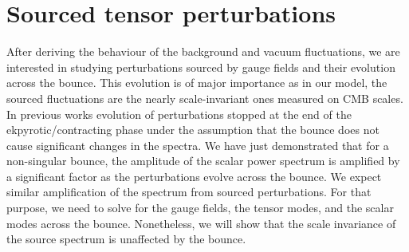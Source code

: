 \documentclass[12pt,a4paper]{article}
\numberwithin{equation}{section}
\numberwithin{equation}{section}
\begin{document}
\section{Sourced tensor perturbations} 
\label{sec:sourced}
After deriving the behaviour of the background and vacuum fluctuations, we are interested in studying perturbations sourced by gauge fields and their evolution across the bounce. This evolution is of major importance as in our model, the sourced fluctuations are the nearly scale-invariant ones measured on CMB scales. In previous works \cite{Artymowski:2020pci,r1,r3} evolution of perturbations stopped at the end of the ekpyrotic/contracting phase under the assumption that the bounce does not cause significant changes in the spectra. %
We have just demonstrated that for a non-singular bounce, the amplitude of the scalar power spectrum is amplified by a significant factor as the perturbations evolve across the bounce. We expect similar amplification of the spectrum from sourced perturbations. %
For that purpose, we need to solve for the gauge fields, the tensor modes, and the scalar modes across the bounce. %
Nonetheless, we will show that the scale invariance of the source spectrum is unaffected by the bounce.
\end{document}
